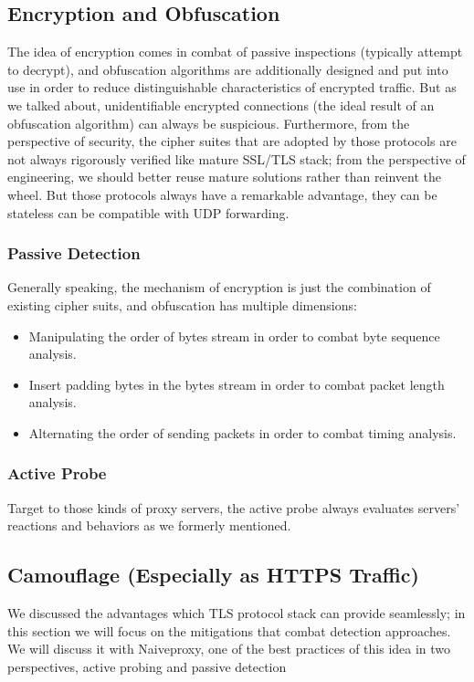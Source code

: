\documentclass[conference]{IEEEtran}
\begin{document}
\subsection{Encryption and Obfuscation}
The idea of encryption comes in combat of passive inspections (typically attempt to decrypt), and obfuscation algorithms are additionally designed and put into use in order to reduce distinguishable characteristics of encrypted traffic.
But as we talked about, unidentifiable encrypted connections (the ideal result of an obfuscation algorithm) can always be suspicious. Furthermore, from the perspective of security, the cipher suites that are adopted by those protocols are not always rigorously verified like mature SSL/TLS stack; from the perspective of engineering, we should better reuse mature solutions rather than reinvent the wheel.
But those protocols always have a remarkable advantage, they can be stateless can be compatible with UDP forwarding.

\subsubsection{Passive Detection}
Generally speaking, the mechanism of encryption is just the combination of existing cipher suits, and obfuscation has multiple dimensions:
\begin{itemize}
    \item Manipulating the order of bytes stream in order to combat byte sequence analysis.
    \item Insert padding bytes in the bytes stream in order to combat packet length analysis.
    \item Alternating the order of sending packets in order to combat timing analysis.
\end{itemize}

\subsubsection{Active Probe}
Target to those kinds of proxy servers, the active probe always evaluates servers' reactions and behaviors as we formerly mentioned.

\subsection{Camouflage (Especially as HTTPS Traffic)}
We discussed the advantages which TLS protocol stack can provide seamlessly; in this section we will focus on the mitigations that combat detection approaches. We will discuss it with Naiveproxy, one of the best practices of this idea in two perspectives, active probing and passive detection
\end{document}
